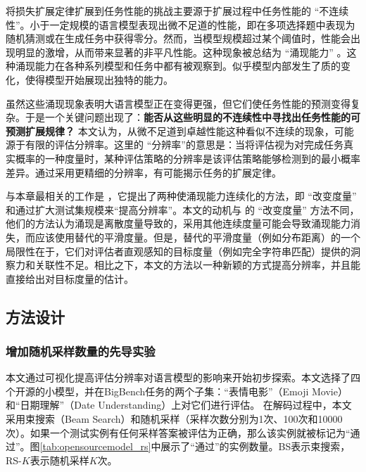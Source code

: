 将损失扩展定律扩展到任务性能的挑战主要源于扩展过程中任务性能的 “不连续性”。小于一定规模的语言模型表现出微不足道的性能，即在多项选择题中表现为随机猜测或在生成任务中获得零分。然而，当模型规模超过某个阈值时，性能会出现明显的激增，从而带来显著的非平凡性能。这种现象被总结为 “涌现能力” \citep{srivastava2022beyond, wei2022emergent}。这种涌现能力在各种系列模型和任务中都有被观察到。似乎模型内部发生了质的变化，使得模型开始展现出独特的能力。

虽然这些涌现现象表明大语言模型正在变得更强，但它们使任务性能的预测变得复杂。于是一个关键问题出现了：\textbf{能否从这些明显的不连续性中寻找出任务性能的可预测扩展规律？} 本文认为，从微不足道到卓越性能这种看似不连续的现象，可能源于有限的评估分辨率。这里的 “分辨率”的意思是：当将评估视为对完成任务真实概率的一种度量时，某种评估策略的分辨率是该评估策略能够检测到的最小概率差异。通过采用更精细的分辨率，有可能揭示任务的扩展定律。 

与本章最相关的工作是 \citet{schaeffer2023emergent}，它提出了两种使涌现能力连续化的方法，即 “改变度量” 和通过扩大测试集规模来“提高分辨率”。本文的动机与 \citet{schaeffer2023emergent} 的 “改变度量” 方法不同，他们的方法认为涌现是离散度量导致的，采用其他连续度量可能会导致涌现能力消失，而应该使用替代的平滑度量。但是，替代的平滑度量（例如分布距离）的一个局限性在于，它们对评估者直观感知的目标度量（例如完全字符串匹配）提供的洞察力和关联性不足。相比之下，本文的方法以一种新颖的方式提高分辨率，并且能直接给出对目标度量的估计。

\subsection{方法设计}
\subsubsection{增加随机采样数量的先导实验}
\label{sec:pilot}
本文通过可视化提高评估分辨率对语言模型的影响来开始初步探索。本文选择了四个开源的小模型，并在BigBench任务的两个子集\citep{srivastava2022beyond}：“表情电影”（Emoji Movie）和“日期理解”（Date Understanding）上对它们进行评估。
在解码过程中，本文采用束搜索（Beam Search）和随机采样（采样次数分别为1次、100次和10000次）。如果一个测试实例有任何采样答案被评估为正确，那么该实例就被标记为“通过”。图\ref{tab:opensourcemodel_rs}中展示了“通过”的实例数量。BS表示束搜索，RS-$K$表示随机采样$K$次。

